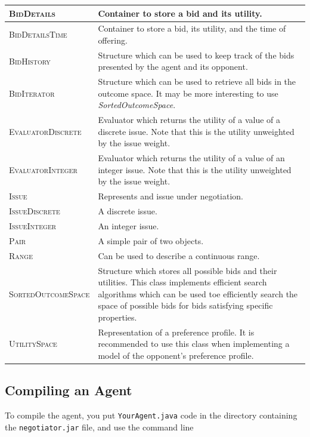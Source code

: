 \documentclass[]{article}
\begin{document}
\begin{center}
\begin{tabular}{|l|p{10.5cm}|}
\hline
\textsc{BidDetails} & Container to store a bid and its utility.\\
\hline
\textsc{BidDetailsTime} & Container to store a bid, its utility, and the time of offering.\\
\hline
\textsc{BidHistory} & Structure which can be used to keep track of the bids presented by the agent and its opponent.\\
\hline
\textsc{BidIterator} & Structure which can be used to retrieve all bids in the outcome space. It may be more interesting to use \textit{SortedOutcomeSpace}.\\
\hline
\textsc{EvaluatorDiscrete} & Evaluator which returns the utility of a value of a discrete issue. Note that this is the utility unweighted by the issue weight.\\
\hline
\textsc{EvaluatorInteger} & Evaluator which returns the utility of a value of an integer issue. Note that this is the utility unweighted by the issue weight.\\
\hline
\textsc{Issue} & Represents and issue under negotiation.\\
\hline
\textsc{IssueDiscrete} & A discrete issue.\\
\hline
\textsc{IssueInteger} & An integer issue.\\
\hline
\textsc{Pair} & A simple pair of two objects.\\
\hline
\textsc{Range} & Can be used to describe a continuous range.\\
\hline
\textsc{SortedOutcomeSpace} & Structure which stores all possible bids and their utilities. This class implements efficient search algorithms which can be used toe efficiently search the space of possible bids for bids satisfying specific properties.\\
\hline
\textsc{UtilitySpace} & Representation of a preference profile. It is recommended to use this class when implementing a model of the opponent's preference profile.\\
\hline
\end{tabular}
\end{center}

\subsection{Compiling an Agent}

To compile the agent, you put \texttt{YourAgent.java} code in the directory containing the \texttt{negotiator.jar} file, and use the command line
\end{document}
